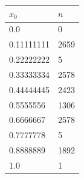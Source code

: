 \documentclass[12pt,a4paper]{article}
\begin{document}
  \begin{tabular}{ | l | l | }
      \hline
      $x_0$ & $n$ \\ \hline
      0.0 & 0 \\ \hline
      0.11111111 & 2659 \\ \hline
      0.22222222 & 5 \\ \hline
      0.33333334 & 2578 \\ \hline
      0.44444445 & 2423 \\ \hline
      0.5555556 & 1306 \\ \hline
      0.6666667 & 2578 \\ \hline
      0.7777778 & 5 \\ \hline
      0.8888889 & 1892 \\ \hline
      1.0 & 1 \\
      \hline
  \end{tabular} %
\end{document}
